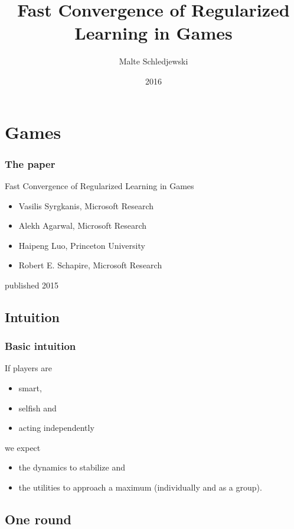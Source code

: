\documentclass{beamer}
\title{Fast Convergence of Regularized Learning in Games}
\author{Malte Schledjewski}
\institute{Saarbrücken Graduate School of Computer Science}
\date{2016}
\begin{document}
	
\frame{\titlepage}

\section{Games}

\begin{frame}
	\frametitle{The paper}
	\begin{block}{Fast Convergence of Regularized Learning in Games}
		\begin{itemize}
			\item Vasilis Syrgkanis, Microsoft Research
			\item Alekh Agarwal, Microsoft Research
			\item Haipeng Luo, Princeton University
			\item Robert E. Schapire, Microsoft Research
		\end{itemize}
		published 2015
	\end{block}
\end{frame}

\subsection{Intuition}
\begin{frame}
	\frametitle{Basic intuition}
    If players are
		\begin{itemize}
			\item smart,
			\item selfish and
			\item acting independently
		\end{itemize}
		
	we expect\pause
	\begin{itemize}
		\item the dynamics to stabilize and
		\item the utilities to approach a maximum (individually and as a group).
	\end{itemize}
\end{frame}





\subsection{One round}
\end{document}
